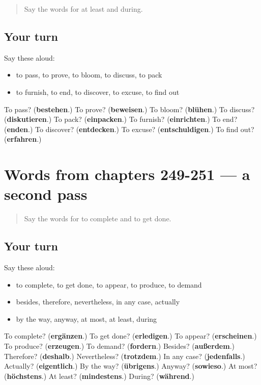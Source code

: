 \begin{quote}
Say the words for at least and during.
\end{quote}

\subsection*{Your turn}
Say these aloud:

\begin{itemize}
\raggedright
  \item to pass, to prove, to bloom, to discuss, to pack
  \item to furnish, to end, to discover, to excuse, to find out
\end{itemize}

\begin{tcolorbox}[breakable,colback=teal!4,colframe=teal!35!black,title={Before you move on}]
To pass? (\textbf{bestehen}.) To prove? (\textbf{beweisen}.) To bloom? (\textbf{blühen}.) To discuss? (\textbf{diskutieren}.) To pack? (\textbf{einpacken}.) To furnish? (\textbf{einrichten}.) To end? (\textbf{enden}.) To discover? (\textbf{entdecken}.) To excuse? (\textbf{entschuldigen}.) To find out? (\textbf{erfahren}.)
\end{tcolorbox}
\section[(dialogue)]{Words from chapters 249-251 — a second pass}

\label{lesson:GE-R251-second-pass-words-from-chapters-249-251}



\begin{quote}
Say the words for to complete and to get done.
\end{quote}

\subsection*{Your turn}
Say these aloud:

\begin{itemize}
\raggedright
  \item to complete, to get done, to appear, to produce, to demand
  \item besides, therefore, nevertheless, in any case, actually
  \item by the way, anyway, at most, at least, during
\end{itemize}

\begin{tcolorbox}[breakable,colback=teal!4,colframe=teal!35!black,title={Before you move on}]
To complete? (\textbf{ergänzen}.) To get done? (\textbf{erledigen}.) To appear? (\textbf{erscheinen}.) To produce? (\textbf{erzeugen}.) To demand? (\textbf{fordern}.) Besides? (\textbf{außerdem}.) Therefore? (\textbf{deshalb}.) Nevertheless? (\textbf{trotzdem}.) In any case? (\textbf{jedenfalls}.) Actually? (\textbf{eigentlich}.) By the way? (\textbf{übrigens}.) Anyway? (\textbf{sowieso}.) At most? (\textbf{höchstens}.) At least? (\textbf{mindestens}.) During? (\textbf{während}.)
\end{tcolorbox}
